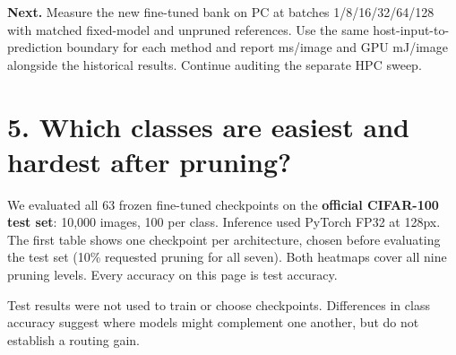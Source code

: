 \documentclass[10pt,a4paper]{article}
\newcommand{\heading}[1]{\section*{\color{navy}#1}}
\newcommand{\smallcap}[1]{{\footnotesize\color{navy}#1}\par}
\begin{document}
\textbf{Next.} Measure the new fine-tuned bank on PC at batches 1/8/16/32/64/128 with matched fixed-model and unpruned references. Use the same host-input-to-prediction boundary for each method and report ms/image and GPU mJ/image alongside the historical results. Continue auditing the separate HPC sweep.
\newpage
\heading{5. Which classes are easiest and hardest after pruning?}
We evaluated all 63 frozen fine-tuned checkpoints on the \textbf{official CIFAR-100 test set}: 10,000 images, 100 per class. Inference used PyTorch FP32 at 128px. The first table shows one checkpoint per architecture, chosen before evaluating the test set (10\% requested pruning for all seven). Both heatmaps cover all nine pruning levels. Every accuracy on this page is test accuracy.

\smallcap{Test results were not used to train or choose checkpoints. Differences in class accuracy suggest where models might complement one another, but do not establish a routing gain.}
\end{document}
